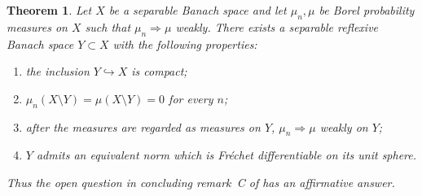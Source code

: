 \documentclass[11pt]{article}
\newtheorem{theorem}{Theorem}
\begin{document}
\begin{theorem}\label{thm:main}
Let $X$ be a separable Banach space and let $\mu_n,\mu$ be Borel probability
measures on $X$ such that $\mu_n\Rightarrow\mu$ weakly.  There exists a
separable reflexive Banach space $Y\subset X$ with the following properties:
\begin{enumerate}
\item the inclusion $Y\hookrightarrow X$ is compact;
\item $\mu_n(X\setminus Y)=\mu(X\setminus Y)=0$ for every $n$;
\item after the measures are regarded as measures on $Y$,
      $\mu_n\Rightarrow\mu$ weakly on $Y$;
\item $Y$ admits an equivalent norm which is Fr\'echet differentiable on its
      unit sphere.
\end{enumerate}
Thus the open question in concluding remark~C of \cite{OS} has an affirmative
answer.
\end{theorem}
\end{document}
